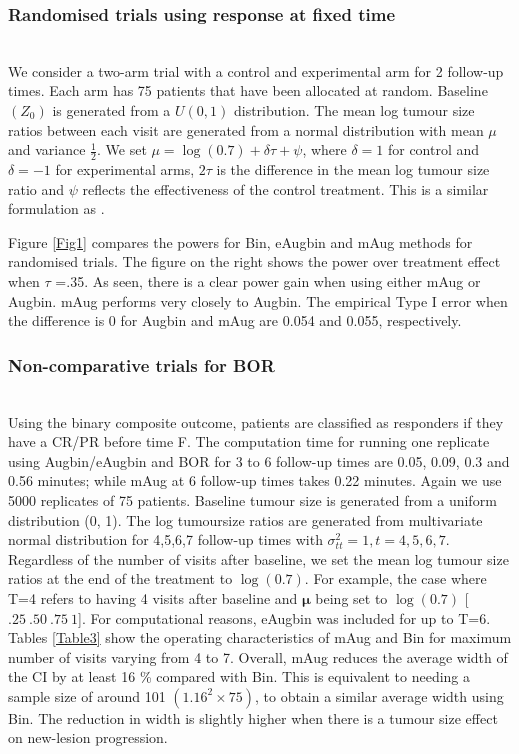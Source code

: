 \documentclass[10pt,A4]{article}
\begin{document}
\subsubsection{Randomised trials using response at fixed time} ~\\
We consider a two-arm trial with a control and experimental arm for 2 follow-up times. Each arm has 75 patients that have been allocated at random. Baseline $(Z_0)$ is generated from a $U(0,1)$ distribution. The mean log tumour size ratios between each visit are generated from a normal distribution with mean $\mu$ and variance $\frac{1}{2}$. We set $\mu= \log(0.7) + \delta \tau + \psi$, where $\delta=1$ for control and $\delta=-1$ for experimental arms, $2\tau$ is the difference in the mean log tumour size ratio and $\psi$ reflects the effectiveness of the control treatment. This is a similar formulation as \cite{Wason2013}.

Figure \ref{Fig1} compares the powers for Bin, eAugbin and mAug methods for randomised trials. The figure on the right shows the power over treatment effect when $\tau$ =.35. As seen, there is a clear power gain when using either mAug or Augbin. mAug performs very closely to Augbin. The empirical Type I error when the difference is 0 for Augbin and mAug are 0.054 and 0.055, respectively.

\subsubsection{Non-comparative trials for BOR} ~\\
Using the binary composite outcome, patients are classified as responders if they have a CR/PR before time F. The computation time for running one replicate using Augbin/eAugbin and BOR for 3 to 6 follow-up times are 0.05, 0.09, 0.3 and 0.56 minutes; while mAug at 6 follow-up times takes 0.22 minutes. Again we use 5000 replicates of 75 patients. Baseline tumour size is generated from a uniform distribution (0, 1). The log tumoursize ratios are generated from multivariate normal distribution for 4,5,6,7 follow-up times with $\sigma_{tt}^2=1, t=4,5,6,7$. Regardless of the number of visits after baseline, we set the mean log tumour size ratios at the end of the treatment to $\log(0.7)$. For example,  the case where T=4 refers to having 4 visits after baseline and $\pmb{\mu}$ being set to $\log(0.7)$ [$.25 \: .50 \: .75 \: 1$]. For computational reasons, eAugbin was included for up to T=6. Tables \ref{Table3} show the operating characteristics of mAug and Bin for maximum number of visits varying from 4 to 7. Overall, mAug reduces the average width of the CI by at least 16 \% compared with Bin.  This is equivalent to needing a sample size of around 101 $(1.16^2 \times 75)$, to obtain a similar average width using Bin. The reduction in width is slightly higher when there is a tumour size effect on new-lesion progression.
\end{document}
